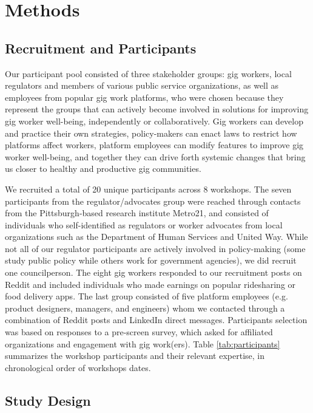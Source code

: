 \newpage
\section{Methods}


\subsection{Recruitment and Participants} \label{recruit}
Our participant pool consisted of three stakeholder groups: gig workers, local regulators and members of various public service organizations, as well as employees from popular gig work platforms, who were chosen because they represent the groups that can actively become involved in solutions for improving gig worker well-being, independently or collaboratively. Gig workers can develop and practice their own strategies, policy-makers can enact laws to restrict  how platforms affect workers, platform employees can modify features to improve gig worker well-being, and together they can drive forth systemic changes that bring us closer to healthy and productive gig communities.

We recruited a total of 20 unique participants across 8 workshops. The seven participants from the regulator/advocates group were reached through contacts from the Pittsburgh-based research institute Metro21, and consisted of individuals who self-identified as regulators or worker advocates from local organizations such as the Department of Human Services and United Way. While not all of our regulator participants are actively involved in policy-making (some study public policy while others work for government agencies), we did recruit one councilperson. The eight gig workers responded to our recruitment posts on Reddit and included individuals who made earnings on popular ridesharing or food delivery apps. The last group consisted of five platform employees (e.g. product designers, managers, and engineers) whom we contacted through a combination of Reddit posts and LinkedIn direct messages. Participants selection was based on responses to a pre-screen survey, which asked for affiliated organizations and engagement with gig work(ers). Table \ref{tab:participants} summarizes the workshop participants and their relevant expertise, in chronological order of workshops dates.
\subsection{Study Design} \label{procedures}
